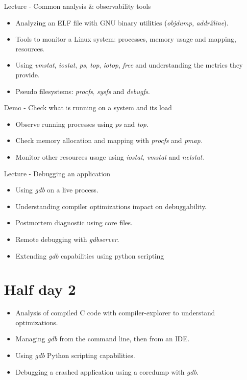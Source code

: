 \documentclass[a4paper,12pt,obeyspaces,spaces,hyphens]{article}
\begin{document}
\feagendaonecolumn
{Lecture - Common analysis \& observability tools}
{
  \begin{itemize}
  \item Analyzing an ELF file with GNU binary utilities
    ({\em objdump}, {\em addr2line}).
  \item Tools to monitor a Linux system: processes, memory
    usage and mapping, resources.
  \item Using {\em vmstat}, {\em iostat}, {\em ps}, {\em top}, {\em
      iotop}, {\em free} and understanding the metrics they provide.
  \item Pseudo filesystems: {\em procfs}, {\em sysfs} and {\em
      debugfs}.
  \end{itemize}
}

\feagendaonecolumn
{Demo - Check what is running on a system and its load}
{
  \begin{itemize}
  \item Observe running processes using {\em ps} and {\em top}.
  \item Check memory allocation and mapping with {\em procfs} and {\em
      pmap}.
  \item Monitor other resources usage using {\em iostat}, {\em vmstat}
    and {\em netstat}.
  \end{itemize}
}

\feagendaonecolumn
{Lecture - Debugging an application}
{
  \begin{itemize}
  \item Using {\em gdb} on a live process.
  \item Understanding compiler optimizations impact on debuggability.
  \item Postmortem diagnostic using core files.
  \item Remote debugging with {\em gdbserver}.
  \item Extending {\em gdb} capabilities using python scripting
  \end{itemize}
}

\section{Half day 2}

{
  \begin{itemize}
  \item Analysis of compiled C code with compiler-explorer to understand
    optimizations.
  \item Managing {\em gdb} from the command line, then from an IDE.
  \item Using {\em gdb} Python scripting capabilities.
  \item Debugging a crashed application using a coredump with {\em gdb}.
  \end{itemize}
}
\end{document}
